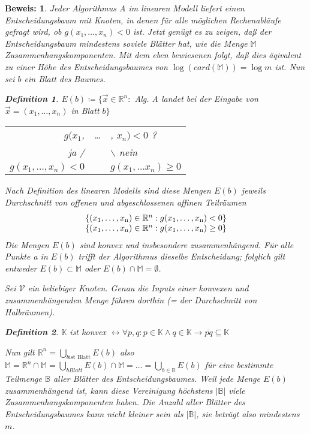 \documentclass[ngerman,draft,parskip=half*,twoside]{scrreprt}
\theoremstyle{break}
\newtheorem{definition}{Definition}[chapter]
\theoremstyle{nonumberbreak}
\newtheorem{beweis}{Beweis:}
\newcommand*{\B}{\mathbb{B}}
\newcommand*{\K}{\mathbb{K}}
\newcommand*{\M}{\mathbb{M}}
\newcommand*{\R}{\mathbb{R}}        %
\begin{document}
\begin{beweis}
Jeder Algorithmus A im linearen Modell liefert einen Entscheidungsbaum mit Knoten, in denen für alle möglichen Rechenabläufe
gefragt wird, ob $ g( x_1, \dots , x_n) < 0 $  ist. Jetzt genügt es zu zeigen, daß der Entscheidungsbaum mindestens soviele
Blätter hat, wie die Menge $ \M  $ Zusammenhangskomponenten. Mit dem eben bewiesenen folgt, daß dies äqivalent zu einer Höhe
des Entscheidungsbaumes von $\log (card(\M))=\log m$ ist. Nun sei $b$ ein Blatt des Baumes.

  \begin{definition}
  $E(b) \coloneqq  \lbrace \vec x \in \R^n : $ Alg. A landet bei der Eingabe von $ \vec x = (x_1, \dots ,x_n) $ in Blatt $ b \rbrace $
  \end{definition}
		
  \begin{tabular}{rcl}
  $ g(x_1$, & \dots & , $ x_n) < 0 $ ? \\
  ja / & & $ \backslash $ nein\\
  $ g(x_1, \dots, x_n) < 0 $ & & $ g(x_1, \dots x_n) \geq 0 $
  \end{tabular}

  
Nach Definition des linearen Modells sind diese Mengen $E(b)$ jeweils Durchschnitt von offenen und abgeschlossenen affinen Teilräumen
\begin{gather*}
  \begin{array}{c}
  \{(x_1,\ldots,x_{\textup{n}}) \in \R^n : g(x_1,\ldots,x_{\textup{n}})<0\}\\
  \{(x_1,\ldots,x_{\textup{n}}) \in \R^n : g(x_1,\ldots,x_{\textup{n}})\geq0\}
  \end{array}
\end{gather*}
Die Mengen $E(b)$ sind konvex und insbesondere zusammenhängend. Für alle Punkte a in $E(b)$ trifft der Algorithmus dieselbe
Entscheidung; folglich gilt entweder $E(b) \subset \M$ oder $E(b) \cap \M=\emptyset$. 

Sei $\mathcal{V}$ ein beliebiger Knoten.
Genau die Inputs einer konvexen und zusammenhängenden Menge führen dorthin (= der Durchschnitt von Halbräumen).	
  
  \begin{definition}	
  $ \K $ ist \textit{konvex}
  $\leftrightarrow  \forall   p,   q: p\in \K \wedge q \in \K
  \rightarrow  \overline{pq} \subseteq \K$
  \end{definition}
  
Nun  gilt $\R^n = \bigcup_{b \text{ist Blatt}} E(b)$ also
$ \M = \R^n \cap \M = \bigcup_{b   Blatt} E(b) \cap \M = \dots = \bigcup_{b \in \B} E(b) $
für eine bestimmte Teilmenge $\B$ aller Blätter des Entscheidungsbaumes. Weil jede Menge $E(b)$ zusammenhängend ist, kann
diese Vereinigung höchstens $\vert\B\vert$ viele Zusammenhangskomponenten haben. Die Anzahl aller Blätter des
Entscheidungsbaumes kann nicht kleiner sein als $\vert\B\vert$, sie beträgt also mindestens $m$.


\end{beweis}
\end{document}
